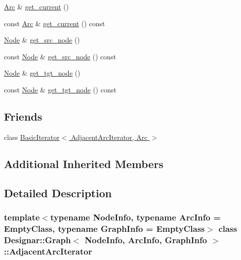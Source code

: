 \begin{DoxyCompactItemize}
\hyperlink{class_designar_1_1_graph_a74c730ef4ce2d20f998d72bd25c2b5bf}{Arc} \& \hyperlink{class_designar_1_1_graph_1_1_adjacent_arc_iterator_a8d4383e587b5a1203581c2c2616ab45f}{get\+\_\+current} ()
\item 
const \hyperlink{class_designar_1_1_graph_a74c730ef4ce2d20f998d72bd25c2b5bf}{Arc} \& \hyperlink{class_designar_1_1_graph_1_1_adjacent_arc_iterator_a42865c7e33a047eb16ef49428ec99e35}{get\+\_\+current} () const
\item 
\hyperlink{class_designar_1_1_graph_a5dfc7dba9d092ac489c72e40390c37d0}{Node} \& \hyperlink{class_designar_1_1_graph_1_1_adjacent_arc_iterator_a0a5f3238f6abde756b4498a31558a255}{get\+\_\+src\+\_\+node} ()
\item 
const \hyperlink{class_designar_1_1_graph_a5dfc7dba9d092ac489c72e40390c37d0}{Node} \& \hyperlink{class_designar_1_1_graph_1_1_adjacent_arc_iterator_ae4ba07319b439cc08df6c957a61bc224}{get\+\_\+src\+\_\+node} () const
\item 
\hyperlink{class_designar_1_1_graph_a5dfc7dba9d092ac489c72e40390c37d0}{Node} \& \hyperlink{class_designar_1_1_graph_1_1_adjacent_arc_iterator_a400e7399fa39eb49e64afcd2d0b26ff6}{get\+\_\+tgt\+\_\+node} ()
\item 
const \hyperlink{class_designar_1_1_graph_a5dfc7dba9d092ac489c72e40390c37d0}{Node} \& \hyperlink{class_designar_1_1_graph_1_1_adjacent_arc_iterator_a6f6a71103fa126fd3317af40844022a1}{get\+\_\+tgt\+\_\+node} () const
\end{DoxyCompactItemize}
\subsection*{Friends}
\begin{DoxyCompactItemize}
\item 
class \hyperlink{class_designar_1_1_graph_1_1_adjacent_arc_iterator_a73ad70d76f3331ee4b07451db1347918}{Basic\+Iterator$<$ Adjacent\+Arc\+Iterator, Arc $>$}
\end{DoxyCompactItemize}
\subsection*{Additional Inherited Members}


\subsection{Detailed Description}
\subsubsection*{template$<$typename Node\+Info, typename Arc\+Info = Empty\+Class, typename Graph\+Info = Empty\+Class$>$\newline
class Designar\+::\+Graph$<$ Node\+Info, Arc\+Info, Graph\+Info $>$\+::\+Adjacent\+Arc\+Iterator}




